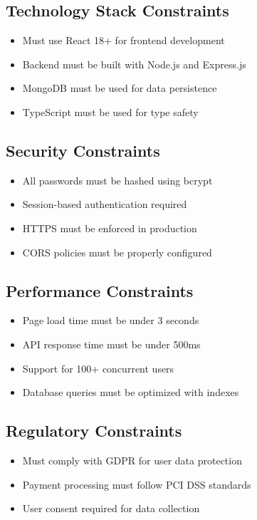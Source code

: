 \documentclass{scrreprt}
\begin{document}
\subsection{Technology Stack Constraints}
\begin{itemize}
\item Must use React 18+ for frontend development
\item Backend must be built with Node.js and Express.js
\item MongoDB must be used for data persistence
\item TypeScript must be used for type safety
\end{itemize}

\subsection{Security Constraints}
\begin{itemize}
\item All passwords must be hashed using bcrypt
\item Session-based authentication required
\item HTTPS must be enforced in production
\item CORS policies must be properly configured
\end{itemize}

\subsection{Performance Constraints}
\begin{itemize}
\item Page load time must be under 3 seconds
\item API response time must be under 500ms
\item Support for 100+ concurrent users
\item Database queries must be optimized with indexes
\end{itemize}

\subsection{Regulatory Constraints}
\begin{itemize}
\item Must comply with GDPR for user data protection
\item Payment processing must follow PCI DSS standards
\item User consent required for data collection
\end{itemize}
\end{document}
